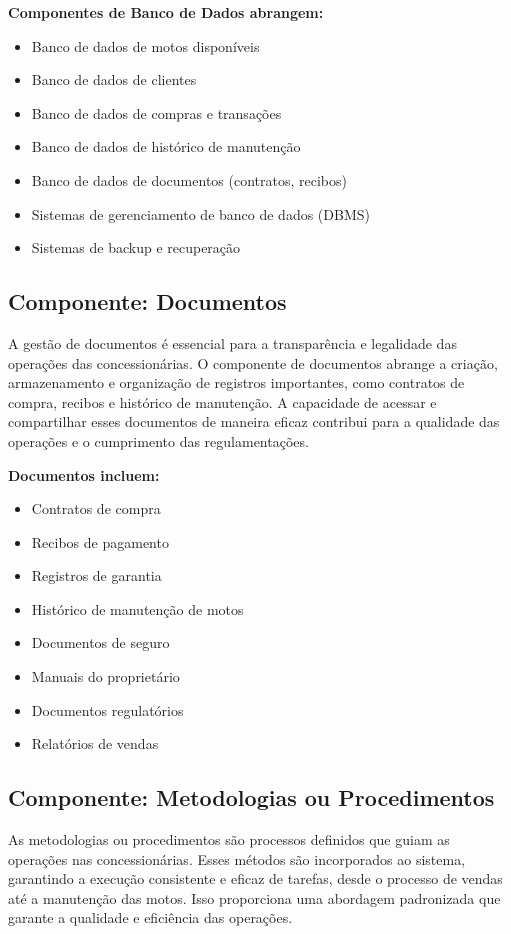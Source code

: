 	\textbf{Componentes de Banco de Dados abrangem:}
	
	\begin{itemize}
		\item Banco de dados de motos disponíveis
		\item Banco de dados de clientes
		\item Banco de dados de compras e transações
		\item Banco de dados de histórico de manutenção
		\item Banco de dados de documentos (contratos, recibos)
		\item Sistemas de gerenciamento de banco de dados (DBMS)
		\item Sistemas de backup e recuperação
	\end{itemize}


     \subsection{Componente: Documentos }
     A gestão de documentos é essencial para a transparência e legalidade das operações das concessionárias. O componente de documentos abrange a criação, armazenamento e organização de registros importantes, como contratos de compra, recibos e histórico de manutenção. A capacidade de acessar e compartilhar esses documentos de maneira eficaz contribui para a qualidade das operações e o cumprimento das regulamentações.
     
	\textbf{Documentos incluem:}
	
	\begin{itemize}
		\item Contratos de compra
		\item Recibos de pagamento
		\item Registros de garantia
		\item Histórico de manutenção de motos
		\item Documentos de seguro
		\item Manuais do proprietário
		\item Documentos regulatórios
		\item Relatórios de vendas
	\end{itemize}


     \subsection{Componente: Metodologias ou Procedimentos}
     As metodologias ou procedimentos são processos definidos que guiam as operações nas concessionárias. Esses métodos são incorporados ao sistema, garantindo a execução consistente e eficaz de tarefas, desde o processo de vendas até a manutenção das motos. Isso proporciona uma abordagem padronizada que garante a qualidade e eficiência das operações.
     

